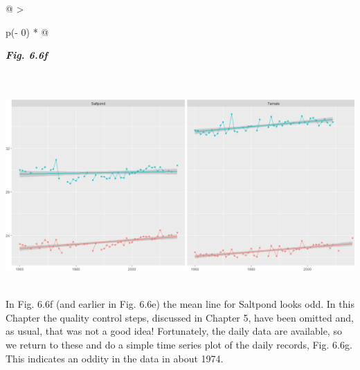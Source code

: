 \documentclass[
  letterpaper,
  DIV=11,
  numbers=noendperiod]{scrreprt}
\begin{document}
\begin{longtable}[]{@{}
  >{\raggedright\arraybackslash}p{(\columnwidth - 0\tabcolsep) * }@{}}
\toprule\noalign{}
\begin{minipage}[b]{\linewidth}\raggedright
\textbf{\emph{Fig. 6.6f}}
\end{minipage} \\
\midrule\noalign{}
\endhead
\bottomrule\noalign{}
\endlastfoot
\includegraphics[width=6.06458in,height=3.00273in]{figures/Fig6.6f.png} \\
\end{longtable}

In Fig. 6.6f (and earlier in Fig. 6.6e) the mean line for Saltpond looks
odd. In this Chapter the quality control steps, discussed in Chapter 5,
have been omitted and, as usual, that was not a good idea! Fortunately,
the daily data are available, so we return to these and do a simple time
series plot of the daily records, Fig. 6.6g. This indicates an oddity in
the data in about 1974.
\end{document}
